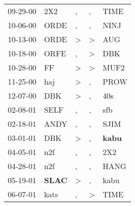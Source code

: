 \begin{supertabular}{p{0.07\textwidth}p{0.06\textwidth}p{0.02\textwidth}p{0.02\textwidth}p{0.06\textwidth}}
          09-29-00\textsuperscript{} &            2X2\textsuperscript{} &                , &                , &           TIME\textsuperscript{} \\
          10-06-00\textsuperscript{} &           ORDE\textsuperscript{} &                , &                , &           NINJ\textsuperscript{} \\
          10-13-00\textsuperscript{} &           ORDE\textsuperscript{} &     \textgreater &     \textgreater &            AUG\textsuperscript{} \\
          10-18-00\textsuperscript{} &           ORFE\textsuperscript{} &                , &     \textgreater &            DBK\textsuperscript{} \\
          10-28-00\textsuperscript{} &             FF\textsuperscript{} &     \textgreater &     \textgreater &           MUF2\textsuperscript{} \\
          11-25-00\textsuperscript{} &            haj\textsuperscript{} &     \textgreater &                , &           PROW\textsuperscript{} \\
          12-07-00\textsuperscript{} &            DBK\textsuperscript{} &     \textgreater &                , &            40s\textsuperscript{} \\
          02-08-01\textsuperscript{} &           SELF\textsuperscript{} &                , &                , &            sfb\textsuperscript{} \\
          02-18-01\textsuperscript{} &           ANDY\textsuperscript{} &                , &                , &           SJIM\textsuperscript{} \\
          03-01-01\textsuperscript{} &            DBK\textsuperscript{} &     \textgreater &                , &  \textbf{kabu\textsuperscript{}} \\
          04-05-01\textsuperscript{} &            n2f\textsuperscript{} &                , &                , &            2X2\textsuperscript{} \\
          04-28-01\textsuperscript{} &            n2f\textsuperscript{} &                , &                , &           HANG\textsuperscript{} \\
          05-19-01\textsuperscript{} &  \textbf{SLAC\textsuperscript{}} &     \textgreater &                , &           kabu\textsuperscript{} \\
          06-07-01\textsuperscript{} &           kats\textsuperscript{} &                , &     \textgreater &           TIME\textsuperscript{} \\

\end{supertabular}
